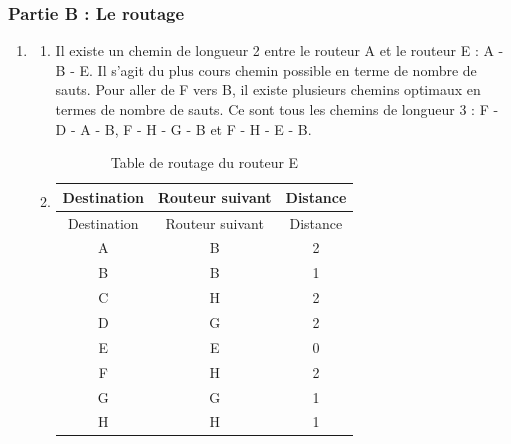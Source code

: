 \documentclass[
  letterpaper,
  DIV=11,
  numbers=noendperiod]{scrartcl}
\begin{document}
\hypertarget{partie-b-le-routage}{%
\subsubsection{Partie B : Le routage}\label{partie-b-le-routage}}

\begin{enumerate}
\def\labelenumi{\arabic{enumi}.}
\item
  \begin{enumerate}
  \def\labelenumii{\alph{enumii}.}
  \item
    Il existe un chemin de longueur 2 entre le routeur A et le routeur E
    : A - B - E. Il s'agit du plus cours chemin possible en terme de
    nombre de sauts. Pour aller de F vers B, il existe plusieurs chemins
    optimaux en termes de nombre de sauts. Ce sont tous les chemins de
    longueur 3 : F - D - A - B, F - H - G - B et F - H - E - B.
  \item
    \begin{longtable}[]{@{}ccc@{}}
    \caption{Table de routage du routeur E}\tabularnewline
    \toprule\noalign{}
    Destination & Routeur suivant & Distance \\
    \midrule\noalign{}
    \endfirsthead
    \toprule\noalign{}
    Destination & Routeur suivant & Distance \\
    \midrule\noalign{}
    \endhead
    \bottomrule\noalign{}
    \endlastfoot
    A & B & 2 \\
    B & B & 1 \\
    C & H & 2 \\
    D & G & 2 \\
    E & E & 0 \\
    F & H & 2 \\
    G & G & 1 \\
    H & H & 1 \\
    \end{longtable}


\end{enumerate}
\end{enumerate}
\end{document}
